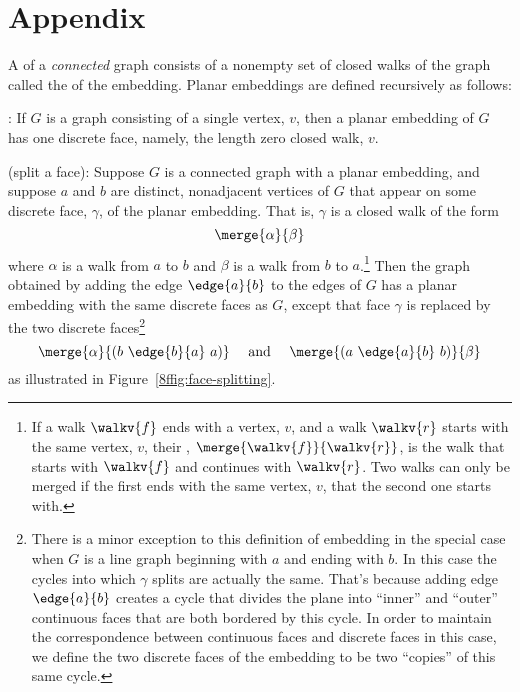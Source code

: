 \documentclass[handout]{mcs}
\begin{document}
\fi

\section*{Appendix}

\begin{definition*} %
A  of a \emph{connected} graph consists of a
nonempty set of closed walks of the graph called the  of the embedding.  Planar embeddings are defined recursively as
follows:

: If $G$ is a graph consisting of a single
vertex, $v$, then a planar embedding of $G$ has one discrete face,
namely, the length zero closed walk, $v$.

 (split a face): Suppose $G$ is a
connected graph with a planar embedding, and suppose $a$ and $b$ are
distinct, nonadjacent vertices of $G$ that appear on some discrete
face, $\gamma$, of the planar embedding.  That is, $\gamma$ is a
closed walk of the form
\[
\merge{\alpha}{\beta}
\]
where $\alpha$ is a walk from $a$ to $b$ and $\beta$ is a walk from
$b$ to $a$.\footnote{
If a walk $\walkv{f}$ ends with a vertex, $v$, and a walk
$\walkv{r}$ starts with the same vertex, $v$, their
, $\merge{\walkv{f}}{\walkv{r}}$, is the walk that starts
with $\walkv{f}$ and continues with $\walkv{r}$.  Two walks can only
be merged if the first ends with the same vertex, $v$, that the second
one starts with.}
Then the graph obtained by adding the edge $\edge{a}{b}$ to the edges
of $G$ has a planar embedding with the same discrete faces as $G$,
except that face $\gamma$ is replaced by the two discrete
faces\footnote{There is a minor exception to this definition
of embedding in the special case when $G$ is a line graph beginning
with $a$ and ending with $b$.  In this case the cycles into which
$\gamma$ splits are actually the same.  That's because adding edge
$\edge{a}{b}$ creates a cycle that divides the plane into ``inner''
and ``outer'' continuous faces that are both bordered by this cycle.
In order to maintain the correspondence between continuous faces and
discrete faces in this case, we define the two discrete faces of the
embedding to be two ``copies'' of this same cycle.}
\[
\merge{\alpha}{(b\ \edge{b}{a}\ a)}
 \quad \text{ and } \quad \merge{(a\ \edge{a}{b}\ b)}{\beta}
\]
as illustrated in Figure~\ref{8ffig:face-splitting}.


\end{definition*}
\end{document}
